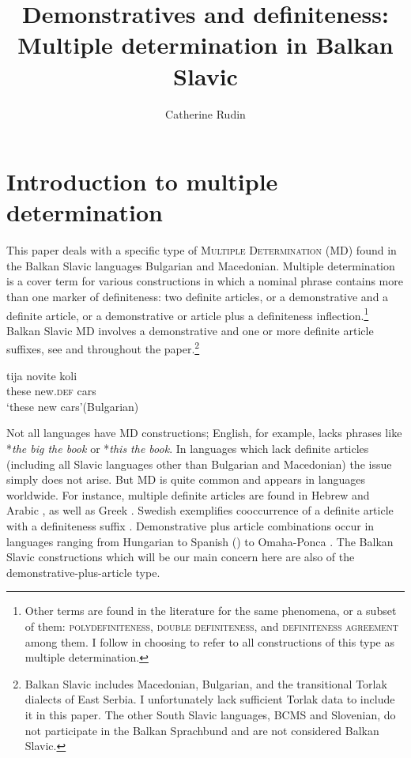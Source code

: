 \documentclass[output=paper,
colorlinks,
citecolor=brown,
newtxmath
]{langscibook}
\author{Catherine Rudin\affiliation{Wayne State College}}
\title{Demonstratives and definiteness: Multiple determination in Balkan Slavic}
\begin{document}
\maketitle

\section{Introduction to multiple determination}
This paper deals with a specific type of \textsc{Multiple Determination} (MD) found in the Balkan Slavic languages Bulgarian and Macedonian. Multiple determination is a cover term for various constructions in which a nominal phrase contains more than one marker of definiteness: two definite articles, or a demonstrative and a definite article, or a demonstrative or article plus a definiteness inflection.\footnote{Other terms are found in the literature for the same phenomena, or a subset of them: \textsc{poly\-definiteness, double definiteness}, and \textsc{definiteness agreement} among them. I follow \cite{Joseph2019} in choosing to refer to all constructions of this type as multiple determination.} Balkan Slavic MD involves a demonstrative and one or more definite article suffixes, see  and throughout the paper.\footnote{Balkan Slavic includes Macedonian, Bulgarian, and the transitional Torlak dialects of East Serbia. I unfortunately lack sufficient Torlak data to include it in this paper. The other South Slavic languages, BCMS and Slovenian, do not participate in the Balkan Sprachbund and are not considered Balkan Slavic.}


\ea \label{ex:cars}
\gll tija novite koli \\
     these new.\textsc{def} cars\\
\glt `these new cars'\hfill (Bulgarian)
\z

\noindent Not all languages have MD constructions; English, for example, lacks phrases like *\textit{the big the book} or *\textit{this the book}. In languages which lack definite articles (including all Slavic languages other than Bulgarian and Macedonian) the issue simply does not arise. But MD is quite common and appears in languages worldwide. For instance, multiple definite articles are found in Hebrew and Arabic \citep{Doron.Khan2015}, as well as Greek \citep{Alexiadou.Wilder1998}. Swedish exemplifies cooccurrence of a definite article with a definiteness suffix \citep{Alexiadou2014}. Demonstrative plus article combinations occur in languages ranging from Hungarian to Spanish (\citealt{Giusti2002}) to Omaha-Ponca \citep{Rudin1993}. The Balkan Slavic constructions which will be our main concern here are also of the demonstrative-plus-article type.
\end{document}
